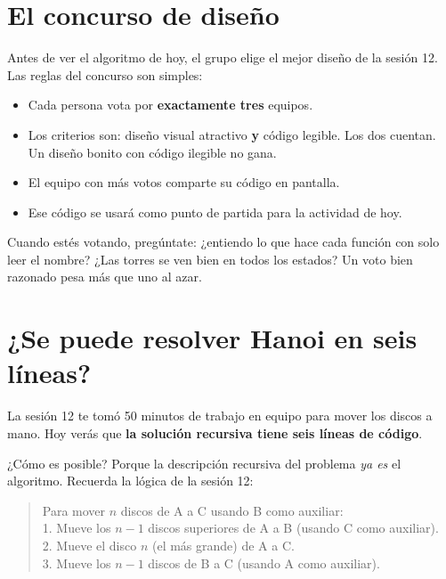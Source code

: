 \documentclass[12pt, oneside]{article}
\begin{document}

\tableofcontents
\newpage

\section{El concurso de diseño}

Antes de ver el algoritmo de hoy, el grupo elige el mejor diseño de la
sesión 12.  Las reglas del concurso son simples:

\begin{itemize}
  \item Cada persona vota por \textbf{exactamente tres} equipos.
  \item Los criterios son: diseño visual atractivo \textbf{y} código legible.
        Los dos cuentan.  Un diseño bonito con código ilegible no gana.
  \item El equipo con más votos comparte su código en pantalla.
  \item Ese código se usará como punto de partida para la actividad de hoy.
\end{itemize}

\begin{consejo}
  Cuando estés votando, pregúntate: ¿entiendo lo que hace cada función con
  solo leer el nombre? ¿Las torres se ven bien en todos los estados?
  Un voto bien razonado pesa más que uno al azar.
\end{consejo}

\section{¿Se puede resolver Hanoi en seis líneas?}

La sesión 12 te tomó 50 minutos de trabajo en equipo para mover los discos
a mano.  Hoy verás que \textbf{la solución recursiva tiene seis líneas de código}.

¿Cómo es posible?  Porque la descripción recursiva del problema \textit{ya es}
el algoritmo.  Recuerda la lógica de la sesión 12:

\begin{quote}
  Para mover $n$ discos de A a C usando B como auxiliar:\\
  1. Mueve los $n-1$ discos superiores de A a B (usando C como auxiliar).\\
  2. Mueve el disco $n$ (el más grande) de A a C.\\
  3. Mueve los $n-1$ discos de B a C (usando A como auxiliar).
\end{quote}
\end{document}
